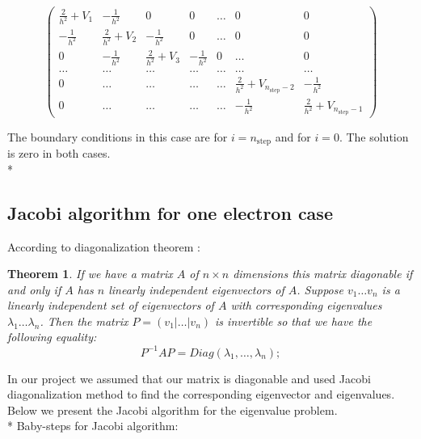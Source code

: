 \documentclass[10pt]{article}
\newtheorem*{theorem}{Theorem}
\begin{document}
\[
\left( 
\begin{array}{ccccccc}
\frac{2}{h^{2}}+V_{1} & -\frac{1}{h^{2}} & 0 & 0 & \dots  & 0 & 0 \\ 
-\frac{1}{h^{2}} & \frac{2}{h^{2}}+V_{2} & -\frac{1}{h^{2}} & 0 & \dots  & 0
& 0 \\ 
0 & -\frac{1}{h^{2}} & \frac{2}{h^{2}}+V_{3} & -\frac{1}{h^{2}} & 0 & \dots 
& 0 \\ 
\dots  & \dots  & \dots  & \dots  & \dots  & \dots  & \dots  \\ 
0 & \dots  & \dots  & \dots  & \dots  & \frac{2}{h^{2}}+V_{n_{\mathrm{step}%
	}-2} & -\frac{1}{h^{2}} \\ 
0 & \dots  & \dots  & \dots  & \dots  & -\frac{1}{h^{2}} & \frac{2}{h^{2}}%
+V_{n_{\mathrm{step}}-1}%
\end{array}%
\right) 
\]

The boundary conditions in this case are for $i=n_{\mathrm{step}}$ and for $%
i=0$. The solution is zero in both cases.\\*
\subsection{Jacobi algorithm for one electron case}
According to diagonalization theorem :
\begin{theorem}

If we have a matrix $ A $ of $ n \times n$ dimensions this matrix diagonable if and only if $ A $ has $ n $ linearly independent eigenvectors of $ A $. Suppose $ v_{1} \dots v_{n} $ is a linearly independent set of eigenvectors of $ A $ with corresponding eigenvalues $ \lambda_{1} \dots \lambda_{n} $. Then the matrix $ P = (v_{1} |\dots |v_{n}) $ is invertible so that we have the following equality:
\begin{equation}
P^{-1}AP=Diag(\lambda_{1},\dots,\lambda_{n});
\end{equation}
\end{theorem}
In our project we assumed that our matrix is diagonable and used Jacobi diagonalization method to find the corresponding eigenvector and eigenvalues. Below we present the Jacobi algorithm for the eigenvalue problem. 
\\*
Baby-steps for Jacobi algorithm:
\end{document}
